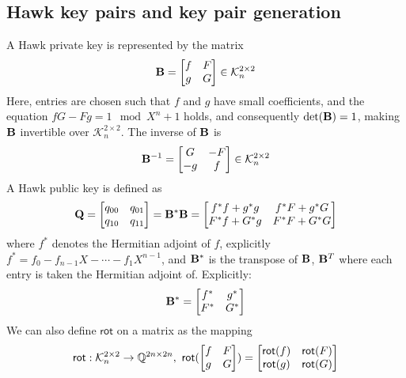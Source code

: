 \subsection{Hawk key pairs and key pair generation}
A Hawk private key is represented by the matrix
\[ \mathbf{B} = 
    \begin{bmatrix} 
        f & F \\
        g & G
    \end{bmatrix}
    \in \mathcal{K}_{n}^{2 \times 2}
\]
Here, entries are chosen such that $f$ and $g$ have small coefficients, and the equation $fG - Fg = 1 \mod X^{n} + 1$ holds, and consequently $\det(\mathbf{B}) = 1$, making $\mathbf{B}$ invertible over $\mathcal{K}_{n}^{2 \times 2}$.
The inverse of $\mathbf{B}$ is 
\[
    \mathbf{B}^{-1} =
    \begin{bmatrix}
        G & -F \\
        -g & f
    \end{bmatrix}
    \in \mathcal{K}_{n}^{2 \times 2}
\]
A Hawk public key is defined as 
\[
    \mathbf{Q} = 
    \begin{bmatrix}
        q_{00} & q_{01} \\
        q_{10} & q_{11}
    \end{bmatrix}
    =
    \mathbf{B}^* \mathbf{B}
    =
    \begin{bmatrix}
        f^* f + g^*g & f^* F + g^*G \\
        F^* f + G^*g & F^*F + G^*G
    \end{bmatrix}
\]
where $f^*$ denotes the Hermitian adjoint of $f$, explicitly $f^* = f_0 - f_{n-1}X - \cdots - f_{1}X^{n-1}$,
and $\mathbf{B}^*$ is the transpose of $\mathbf{B}$, $\mathbf{B}^T$ where each entry is taken the Hermitian adjoint of. Explicitly:
\[
    \mathbf{B}^* = 
    \begin{bmatrix}
        f^* & g^* \\
        F^* & G^*
    \end{bmatrix}
\]
We can also define $\mathsf{rot}$ on a matrix as the mapping 
\[\mathsf{rot}: \mathcal{K}_n^{2 \times 2} \rightarrow \bb{Q}^{2n \times 2n}, \ 
    \mathsf{rot}(
    \begin{bmatrix}
        f & F \\
        g & G
    \end{bmatrix}
    )
    =
    \begin{bmatrix}
        \mathsf{rot}(f) & \mathsf{rot}(F) \\
        \mathsf{rot}(g) & \mathsf{rot}(G)
    \end{bmatrix}
\]

